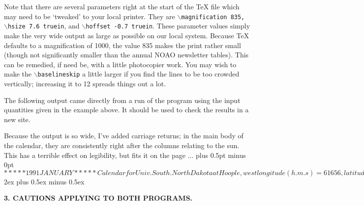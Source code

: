 Note that there are several
parameters right at the start of the TeX file which may need to
be `tweaked' to your local printer.  
They are {\tt $\backslash$magnification 835,
$\backslash$hsize 7.6 truein}, and {\tt  $\backslash$hoffset -0.7 truein}.  
These parameter values simply
make the very wide output as large 
as possible on our local system.   Because TeX defaults to a magnification
of 1000, the value 835 makes the print rather small (though not
significantly smaller than the annual NOAO newsletter tables).
This can be remedied, if need be, with a little photocopier work.
You may wish to make the {\tt  $\backslash$baselineskip} a little larger if you
find the lines to be too crowded vertically; increasing it to
12 spreads things out a lot. 


The following output came directly from a run of the program using
the input quantities given in the example above.  It should be used
to check the results in a new site.  

Because the output is so wide, I've added carriage returns; in the 
main body of the calendar, they are consistently right after the
columns relating to the sun.  This has a terrible effect on legibility, 
but fits it on the page $\ldots$
\parskip 0pt plus 0.5pt minus 0pt
\verbatim$

                                        ***** 1991 JANUARY *****

Calendar for Univ. South. North Dakota at Hoople, west longitude 
(h.m.s) = 6 16 56, latitude (d.m) =  44 44.7
Note that each line lists events of one night, spanning two calendar 
dates.  Rise/set times are given
in Central time (  6 hr W), uncorrected for elevation, DAYLIGHT time 
used, * shows night clocks are reset.
Moon coords. and illum. are for local midnight, even if moon is down.  
Program: John Thorstensen, Dartmouth College.

  Date (eve/morn)      JDmid    LMSTmidn   ---------- Sun: ---------   
LST twilight:  ------------- Moon: --------------
  (1991 at start)    (-2440000)            set  twi.end twi.beg rise
    eve    morn    rise   set  %

Tue Jan 01/Wed Jan 02  8258.8    6 28 34   16 47  18 33   6 09  7 54
    1 00  12 38   18 08  .....    97   8 17.7  18 56
Wed Jan 02/Thu Jan 03  8259.8    6 32 31   16 48  18 33   6 09  7 54
    1 05  12 42   19 29  .....    91   9 15.5  13 45
Thu Jan 03/Fri Jan 04  8260.8    6 36 28   16 49  18 34   6 09  7 54
    1 10  12 46   20 47  .....    83  10 08.9   7 58
$
\parskip 2ex plus 0.5ex minus 0.5ex
\bigskip 	
\centerline{\bf 3. CAUTIONS APPLYING TO BOTH PROGRAMS.}

